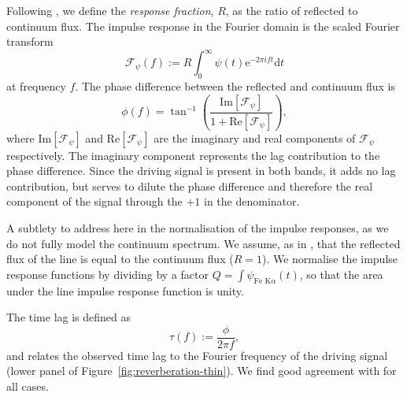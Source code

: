 \documentclass[fleqn,usenatbib]{mnras}
\newcommand{\e}{\text{e}}
\renewcommand{\d}{\text{d}}
\renewcommand{\Im}[1]{\text{Im}\left[#1\right]}
\renewcommand{\Re}[1]{\text{Re}\left[#1\right]}
\begin{document}
Following \cite{cackett_modelling_2014}, we define the \textit{response
fraction}, $R$, as the ratio of reflected to continuum flux. The impulse response
in the Fourier domain is the scaled Fourier transform
\begin{equation}
    \mathscr{F}_\psi(f) := R \int_{0}^\infty \psi(t) \e^{-2\pi i f t} \d t
\end{equation}
at frequency $f$.
The phase difference between the reflected and continuum flux is
\begin{equation}
    \phi(f) = \tan^{-1} \left(
        \frac{\Im{\mathscr{F}_\psi}}{1 + \Re{\mathscr{F}_\psi}}
    \right),
\end{equation}
where $\Im{\mathscr{F}_\psi}$ and $\Re{\mathscr{F}_\psi}$ are the imaginary and
real components of $\mathscr{F}_\psi$ respectively. The imaginary component
represents the lag contribution to the phase difference. Since the driving
signal is present in both bands, it adds no lag contribution, but serves to
dilute the phase difference and therefore the real component of the signal
through the $+1$ in the denominator.

A subtlety to address here in the normalisation of the impulse responses, as we
do not fully model the continuum spectrum. We assume, as in
\cite{cackett_modelling_2014}, that the reflected flux of the line is equal to
the continuum flux ($R = 1$). We normalise the impulse response functions by
dividing by a factor $Q = \int \psi_{\text{Fe K}\alpha}(t)$, so that the area
under the line impulse response function is unity.


The time lag is defined as
\begin{equation}
    \tau(f) := \frac{\phi}{2 \pi f},
\end{equation}
and relates the observed time lag to the Fourier frequency of the driving
signal (lower panel of Figure~\ref{fig:reverberation-thin}).  We find good
agreement with \cite{cackett_modelling_2014} for all cases.
\end{document}
